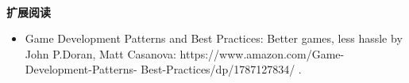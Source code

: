 \noindent\textbf{}\ \par
\textbf{扩展阅读} \ \par
\begin{itemize}
	\item Game Development Patterns and Best Practices: Better games, less hassle by John P.Doran, Matt Casanova:  https:/​/​www.​amazon.​com/​Game-​Development-​Patterns-	Best-​Practices/​dp/​1787127834/​ .
\end{itemize}

\newpage









